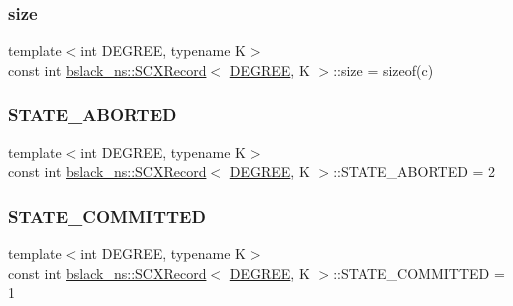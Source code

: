 \subsubsection{\texorpdfstring{size}{size}}
{\footnotesize\ttfamily template$<$int D\+E\+G\+R\+EE, typename K$>$ \\
const int \hyperlink{structbslack__ns_1_1SCXRecord}{bslack\+\_\+ns\+::\+S\+C\+X\+Record}$<$ \hyperlink{brown__sigouin__abtree__kcas_2adapter_8h_a5d88b17d70c985f2f2b8e987037fd6dd}{D\+E\+G\+R\+EE}, K $>$\+::size = sizeof(c)\hspace{0.3cm}{\ttfamily [static]}}

\mbox{\label{structbslack__ns_1_1SCXRecord_add0428c9ceca3a9b0366ebf51127e888}} 
\subsubsection{\texorpdfstring{S\+T\+A\+T\+E\+\_\+\+A\+B\+O\+R\+T\+ED}{STATE\_ABORTED}}
{\footnotesize\ttfamily template$<$int D\+E\+G\+R\+EE, typename K$>$ \\
const int \hyperlink{structbslack__ns_1_1SCXRecord}{bslack\+\_\+ns\+::\+S\+C\+X\+Record}$<$ \hyperlink{brown__sigouin__abtree__kcas_2adapter_8h_a5d88b17d70c985f2f2b8e987037fd6dd}{D\+E\+G\+R\+EE}, K $>$\+::S\+T\+A\+T\+E\+\_\+\+A\+B\+O\+R\+T\+ED = 2\hspace{0.3cm}{\ttfamily [static]}}

\mbox{\label{structbslack__ns_1_1SCXRecord_add6be2636d8e0da7cbef46457ba9d5a0}} 
\subsubsection{\texorpdfstring{S\+T\+A\+T\+E\+\_\+\+C\+O\+M\+M\+I\+T\+T\+ED}{STATE\_COMMITTED}}
{\footnotesize\ttfamily template$<$int D\+E\+G\+R\+EE, typename K$>$ \\
const int \hyperlink{structbslack__ns_1_1SCXRecord}{bslack\+\_\+ns\+::\+S\+C\+X\+Record}$<$ \hyperlink{brown__sigouin__abtree__kcas_2adapter_8h_a5d88b17d70c985f2f2b8e987037fd6dd}{D\+E\+G\+R\+EE}, K $>$\+::S\+T\+A\+T\+E\+\_\+\+C\+O\+M\+M\+I\+T\+T\+ED = 1\hspace{0.3cm}{\ttfamily [static]}}

